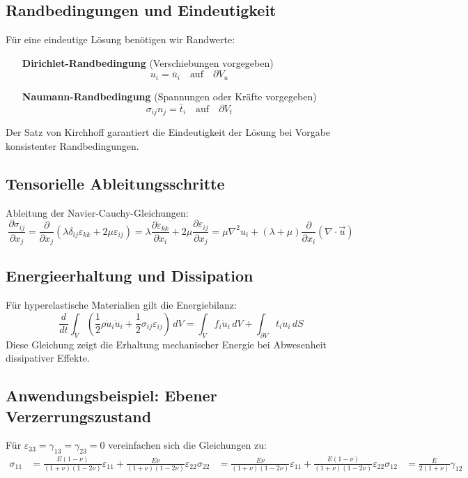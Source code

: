 \subsection{Randbedingungen und Eindeutigkeit}
Für eine eindeutige Lösung benötigen wir Randwerte:
	\begin{enumerate}
		\item[\textbf{Dirichlet-Randbedingung}] (Verschiebungen vorgegeben)
			\begin{equation}
				u_i = 
				\bar{u}_i \quad \text{auf} \quad \partial V_u
			\end{equation}
		\item[\textbf{Naumann-Randbedingung}] (Spannungen oder Kräfte vorgegeben)
			\begin{equation}
				\sigma_{ij} n_j = 
				\bar{t}_i \quad \text{auf} \quad \partial V_t
			\end{equation}		
	\end{enumerate}
Der Satz von Kirchhoff garantiert die Eindeutigkeit der Lösung bei Vorgabe konsistenter Randbedingungen.

\subsection{Tensorielle Ableitungsschritte}
Ableitung der Navier-Cauchy-Gleichungen:
	\begin{equation}
		\frac{\partial \sigma_{ij}}{\partial x_j} = 
		\frac{\partial}{\partial x_j} \left( \lambda \delta_{ij} \varepsilon_{kk} + 2\mu \varepsilon_{ij} \right) = 
		\lambda \frac{\partial \varepsilon_{kk}}{\partial x_i} + 2\mu \frac{\partial \varepsilon_{ij}}{\partial x_j}	
		= \mu \nabla^2 u_i + (\lambda + \mu) \frac{\partial}{\partial x_i} (\nabla \cdot \vec{u})
	\end{equation}

\subsection{Energieerhaltung und Dissipation}
Für hyperelastische Materialien gilt die Energiebilanz:
	\begin{equation}
		\frac{d}{dt} \int_V \left( \frac{1}{2} \rho \dot{u}_i \dot{u}_i + \frac{1}{2} \sigma_{ij} \varepsilon_{ij} \right) \, dV = 
		\int_V f_i \dot{u}_i \, dV + \int_{\partial V} t_i \dot{u}_i \, dS
	\end{equation}
Diese Gleichung zeigt die Erhaltung mechanischer Energie bei Abwesenheit dissipativer Effekte.

\subsection{Anwendungsbeispiel: Ebener Verzerrungszustand}
Für \(\varepsilon_{33} = \gamma_{13} = \gamma_{23} = 0\) vereinfachen sich die Gleichungen zu:
	\begin{align}
		\sigma_{11} &=	\frac{E (1-\nu)}{(1+\nu)(1-2\nu)} \varepsilon_{11} + \frac{E \nu}{(1+\nu)(1-2\nu)} \varepsilon_{22}
		\sigma_{22} &=	\frac{E \nu}{(1+\nu)(1-2\nu)} \varepsilon_{11} + \frac{E (1-\nu)}{(1+\nu)(1-2\nu)} \varepsilon_{22}
		\sigma_{12} &=	\frac{E}{2(1+\nu)} \gamma_{12}
	\end{align}